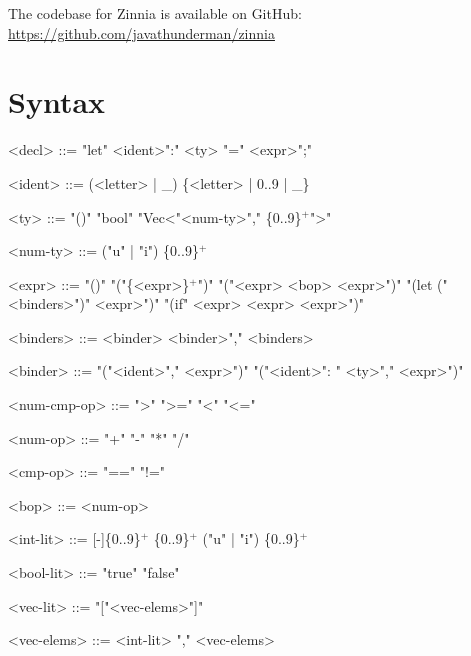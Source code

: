 \documentclass[12pt]{article}
\begin{document}
The codebase for Zinnia is available on GitHub: \url{https://github.com/javathunderman/zinnia}

\section{Syntax}
\setlength{\grammarparsep}{20pt plus 1pt minus 1pt}
\setlength{\grammarindent}{12em}

\begin{grammar}

<decl> ::= "let" <ident>":" <ty> "=" <expr>";"

<ident> ::= (<letter> | \_) \{<letter> | 0..9 | \_\}

<ty> ::= "()"
    \alt "bool"
    \alt "Vec<"<num-ty>"," \{0..9\}$^+$">"

<num-ty> ::= ("u" | "i") \{0..9\}$^+$

<expr> ::= "()"
    \alt "("\{<expr>\}$^+$")"
    \alt "("<expr> <bop> <expr>")"
    \alt "(let ("<binders>")" <expr>")"
    \alt "(if" <expr> <expr> <expr>")"

<binders> ::= <binder> \alt <binder>"," <binders>

<binder> ::= "("<ident>"," <expr>")"
\alt "("<ident>": " <ty>"," <expr>")"

<num-cmp-op> ::= ">" \alt ">=" \alt "<" \alt "<="

<num-op> ::= "+" \alt "-" \alt "*" \alt "/"

<cmp-op> ::= "==" \alt "!="

<bop> ::= <num-op>

<int-lit> ::= [-]\{0..9\}$^+$
    \alt [-]\{0..9\}$^+$ ("u" | "i") \{0..9\}$^+$

<bool-lit> ::= "true" \alt "false"

<vec-lit> ::= "["<vec-elems>"]"

<vec-elems> ::= <int-lit> "," <vec-elems>
\end{grammar}
\end{document}
